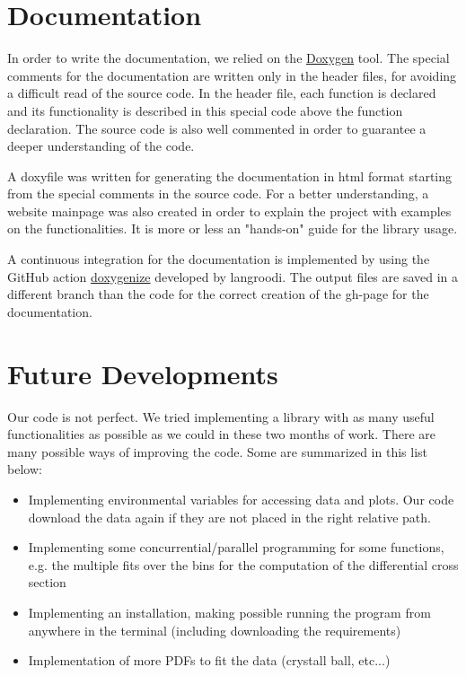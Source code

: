 \documentclass{article}
\begin{document}
\section{Documentation}
In order to write the documentation, we relied on the \href{https://www.doxygen.nl}{Doxygen} tool. The special comments for the documentation are written only in the header files, for avoiding a difficult read of the source code. In the header file, each function is declared and its functionality is described in this special code above the function declaration.
The source code is also well commented in order to guarantee a deeper understanding of the code. 

A doxyfile was written for generating the documentation in html format starting from the special comments in the source code. For a better understanding, a website mainpage was also created in order to explain the project with examples on the functionalities. It is more or less an "hands-on" guide for the library usage.

A continuous integration for the documentation is implemented by using the GitHub action \href{https://github.com/langroodi/doxygenize}{doxygenize} developed by langroodi. The output files are saved in a different branch than the code for the correct creation of the gh-page for the documentation.

\section{Future Developments}
Our code is not perfect. We tried implementing a library with as many useful functionalities as possible as we could in these two months of work. There are many possible ways of improving the code. Some are summarized in this list below:
\begin{itemize}
    \item Implementing environmental variables for accessing data and plots. Our code download the data again if they are not placed in the right relative path.
    \item Implementing some concurrential/parallel programming for some functions, e.g. the multiple fits over the bins for the computation of the differential cross section
    \item Implementing an installation, making possible running the program from anywhere in the terminal (including downloading the requirements)
    \item Implementation of more PDFs to fit the data (crystall ball, etc...)
    
\end{itemize}
\end{document}
